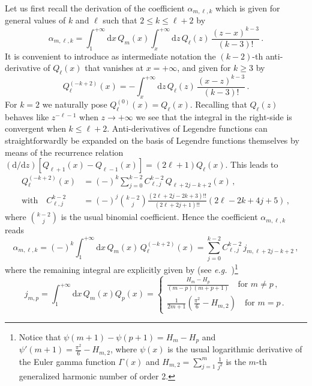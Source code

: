 \documentclass[prd,preprint,superscriptaddress,tightenlines,nofootinbib,
  eqsecnum,showpacs]{revtex4}
\newcommand{\ud}{\mathrm{d}}
\begin{document}
Let us first recall the derivation of the coefficient
$\alpha_{m,\ell,k}$ which is given for general values of $k$ and
$\ell$ such that $2 \leqslant k \leqslant \ell+2$ by
%
\begin{equation} \label{eqkmalphal}
\alpha_{m,\ell,k} = \int_1^{+\infty} \!\!\!\! \ud x \, Q_m(x)
\int_{x}^{+\infty} \ud z \, Q_\ell(z)\,\frac{(z-x)^{k-3}}{(k-3)!}\,.
\end{equation}
%
It is convenient to introduce as intermediate notation the
$(k-2)$-th anti-derivative of $Q_\ell(x)$ that vanishes at
$x=+\infty$, and given for $k\geqslant 3$ by
%
\begin{equation}\label{antiderQ}
Q^{(-k+2)}_\ell(x) = - \int_{x}^{+\infty}\ud
z\,Q_\ell(z)\,\frac{(x-z)^{k-3}}{(k-3)!} \,.
\end{equation}
%
For $k=2$ we naturally pose $Q^{(0)}_\ell(x)=Q_\ell(x)$. Recalling
that $Q_\ell(z)$ behaves like $z^{-\ell-1}$ when $z\to+\infty$ we see
that the integral in the right-side is convergent when $k \leqslant
\ell+2$. Anti-derivatives of Legendre functions can straightforwardly
be expanded on the basis of Legendre functions themselves by means of
the recurrence relation $(\ud/\ud z)[Q_{\ell+1}(x)- Q_{\ell-1}(x)] =
(2\ell +1) Q_\ell (x)$. This leads to
%
\begin{align}\label{expandQ}
Q^{(-k+2)}_\ell(x) &= (-)^k \sum_{j=0}^{k-2}
C_{\ell,j}^{k-2}\,Q_{\ell+2j-k+2}(x)\,,\\ \text{with}\quad
C_{\ell,j}^{k-2} &= (-)^j{\genfrac{(}{)}{0pt}{}{k-2}{j}}
\frac{(2\ell+2j-2k+3)!!}{(2\ell+2j+1)!!}(2\ell-2k+4j+5)\,,
\end{align}
%
where ${\genfrac{(}{)}{0pt}{}{k-2}{j}}$ is the usual binomial
coefficient. Hence the coefficient $\alpha_{m,\ell,k}$ reads
%
\begin{equation} \label{alphaalt}
\alpha_{m,\ell,k} = (-)^k \int_1^{+\infty} \!\!\!\! \ud x \,
Q_m(x)\,Q^{(-k+2)}_\ell(x) =
\sum_{j=0}^{k-2}C_{\ell,j}^{k-2}\,j_{m,\ell+2j-k+2}\,,
\end{equation}
%
where the remaining integral are explicitly given by (see
\textit{e.g.}~\cite{GR})\footnote{Notice that
  $\psi(m+1)-\psi(p+1)=H_m-H_p$ and
  $\psi'(m+1)=\frac{\pi^2}{6}-H_{m,2}$, where $\psi(x)$ is the usual
  logarithmic derivative of the Euler gamma function $\Gamma(x)$ and
  $H_{m,2}= \sum_{j=1}^m \frac{1}{j^2}$ is the $m$-th generalized
  harmonic number of order 2.}
%
\begin{equation}
\label{jmp}
j_{m,p} = \int_1^{+\infty} \ud x\, Q_m(x) Q_p(x) =
\left\{\begin{array}{l}\displaystyle
\frac{H_m-H_p}{(m-p)(m+p+1)}\quad\text{for $m\not=
  p$}\,,\\[0.6cm]\displaystyle
\frac{1}{2m+1}\left(\frac{\pi^2}{6}-H_{m,2} \right)\quad\text{for
  $m=p$}\,.\end{array}\right.
\end{equation}
%
\end{document}
